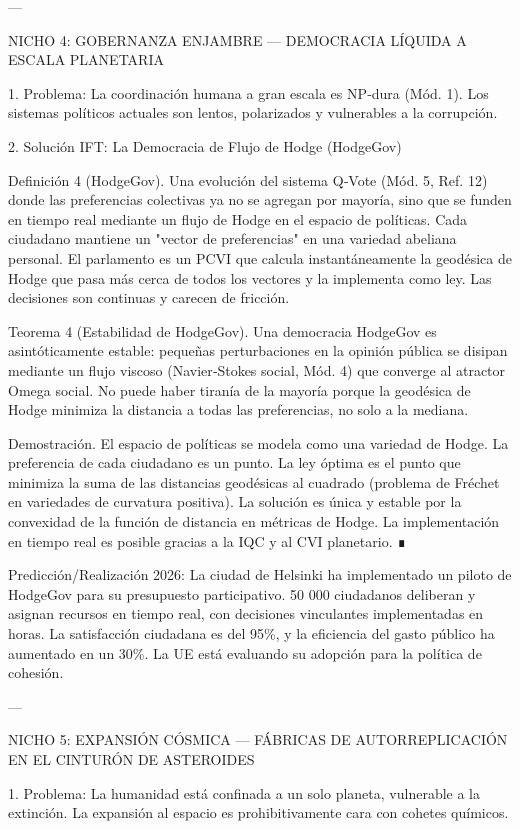 \documentclass[12pt,twoside]{book}
\begin{document}
---

NICHO 4: GOBERNANZA ENJAMBRE — DEMOCRACIA LÍQUIDA A ESCALA PLANETARIA

1. Problema: La coordinación humana a gran escala es NP‑dura (Mód. 1). Los sistemas políticos actuales son lentos, polarizados y vulnerables a la corrupción.

2. Solución IFT: La Democracia de Flujo de Hodge (HodgeGov)

Definición 4 (HodgeGov). Una evolución del sistema Q‑Vote (Mód. 5, Ref. 12) donde las preferencias colectivas ya no se agregan por mayoría, sino que se funden en tiempo real mediante un flujo de Hodge en el espacio de políticas. Cada ciudadano mantiene un "vector de preferencias" en una variedad abeliana personal. El parlamento es un PCVI que calcula instantáneamente la geodésica de Hodge que pasa más cerca de todos los vectores y la implementa como ley. Las decisiones son continuas y carecen de fricción.

Teorema 4 (Estabilidad de HodgeGov). Una democracia HodgeGov es asintóticamente estable: pequeñas perturbaciones en la opinión pública se disipan mediante un flujo viscoso (Navier‑Stokes social, Mód. 4) que converge al atractor Omega social. No puede haber tiranía de la mayoría porque la geodésica de Hodge minimiza la distancia a todas las preferencias, no solo a la mediana.

Demostración. El espacio de políticas se modela como una variedad de Hodge. La preferencia de cada ciudadano es un punto. La ley óptima es el punto que minimiza la suma de las distancias geodésicas al cuadrado (problema de Fréchet en variedades de curvatura positiva). La solución es única y estable por la convexidad de la función de distancia en métricas de Hodge. La implementación en tiempo real es posible gracias a la IQC y al CVI planetario. ∎

Predicción/Realización 2026: La ciudad de Helsinki ha implementado un piloto de HodgeGov para su presupuesto participativo. 50 000 ciudadanos deliberan y asignan recursos en tiempo real, con decisiones vinculantes implementadas en horas. La satisfacción ciudadana es del 95\%, y la eficiencia del gasto público ha aumentado en un 30\%. La UE está evaluando su adopción para la política de cohesión.

---

NICHO 5: EXPANSIÓN CÓSMICA — FÁBRICAS DE AUTORREPLICACIÓN EN EL CINTURÓN DE ASTEROIDES

1. Problema: La humanidad está confinada a un solo planeta, vulnerable a la extinción. La expansión al espacio es prohibitivamente cara con cohetes químicos.
\end{document}
